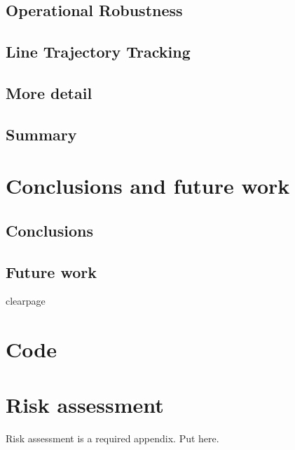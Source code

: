     \subsection{Operational Robustness}
    \subsection{Line Trajectory Tracking}
    \subsection{More detail}
    \subsection{Summary}
  \section{Conclusions and future work} %
    \subsection{Conclusions}
      \subsection{Future work}
  clearpage %
  \printbibliography[title={References},heading=bibintoc] %
  \begin{uomappendix} 
      \section{Code}
      \section{Risk assessment}
      Risk assessment is a required appendix. Put here.
  \end{uomappendix}
  
  